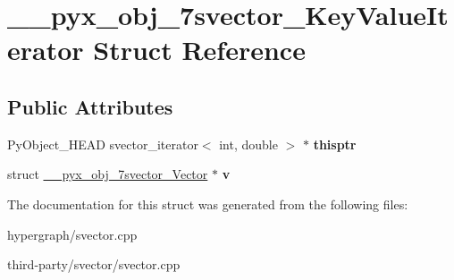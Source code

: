 \hypertarget{struct____pyx__obj__7svector__KeyValueIterator}{
\section{\_\-\_\-pyx\_\-obj\_\-7svector\_\-KeyValueIterator Struct Reference}
\label{struct____pyx__obj__7svector__KeyValueIterator}
}
\subsection*{Public Attributes}
\begin{DoxyCompactItemize}
\item 
\hypertarget{struct____pyx__obj__7svector__KeyValueIterator_a18a0d0cb652073d34d4e2025e858c0c1}{
PyObject\_\-HEAD svector\_\-iterator$<$ int, double $>$ $\ast$ {\bfseries thisptr}}
\label{struct____pyx__obj__7svector__KeyValueIterator_a18a0d0cb652073d34d4e2025e858c0c1}

\item 
\hypertarget{struct____pyx__obj__7svector__KeyValueIterator_a4886fcd2aaaecde593025b1d4490ea4e}{
struct \hyperlink{struct____pyx__obj__7svector__Vector}{\_\-\_\-pyx\_\-obj\_\-7svector\_\-Vector} $\ast$ {\bfseries v}}
\label{struct____pyx__obj__7svector__KeyValueIterator_a4886fcd2aaaecde593025b1d4490ea4e}

\end{DoxyCompactItemize}


The documentation for this struct was generated from the following files:\begin{DoxyCompactItemize}
\item 
hypergraph/svector.cpp\item 
third-\/party/svector/svector.cpp\end{DoxyCompactItemize}
